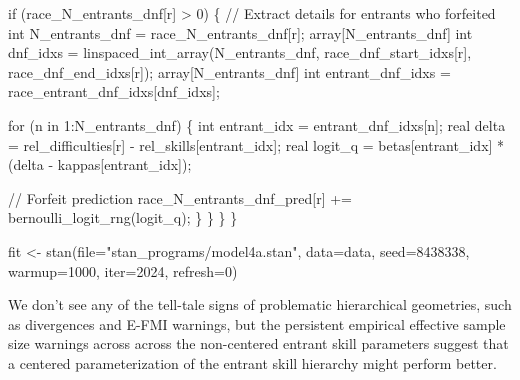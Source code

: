 \documentclass[
  letterpaper,
  DIV=11,
  numbers=noendperiod]{scrartcl}
\newenvironment{Shaded}{\begin{snugshade}}{\end{snugshade}}
\newcommand{\AttributeTok}[1]{\textcolor[rgb]{0.40,0.45,0.13}{#1}}
\newcommand{\CommentTok}[1]{\textcolor[rgb]{0.37,0.37,0.37}{#1}}
\newcommand{\ControlFlowTok}[1]{\textcolor[rgb]{0.00,0.23,0.31}{#1}}
\newcommand{\DataTypeTok}[1]{\textcolor[rgb]{0.68,0.00,0.00}{#1}}
\newcommand{\DecValTok}[1]{\textcolor[rgb]{0.68,0.00,0.00}{#1}}
\newcommand{\FunctionTok}[1]{\textcolor[rgb]{0.28,0.35,0.67}{#1}}
\newcommand{\NormalTok}[1]{\textcolor[rgb]{0.00,0.23,0.31}{#1}}
\newcommand{\OtherTok}[1]{\textcolor[rgb]{0.00,0.23,0.31}{#1}}
\newcommand{\StringTok}[1]{\textcolor[rgb]{0.13,0.47,0.30}{#1}}
\begin{document}
\begin{codelisting}
\begin{Shaded}
\begin{Highlighting}[]
    \ControlFlowTok{if}\NormalTok{ (race\_N\_entrants\_dnf[r] \textgreater{} }\DecValTok{0}\NormalTok{) \{}
      \CommentTok{// Extract details for entrants who forfeited}
      \DataTypeTok{int}\NormalTok{ N\_entrants\_dnf = race\_N\_entrants\_dnf[r];}
      \DataTypeTok{array}\NormalTok{[N\_entrants\_dnf]}
        \DataTypeTok{int}\NormalTok{ dnf\_idxs = linspaced\_int\_array(N\_entrants\_dnf,}
\NormalTok{                                           race\_dnf\_start\_idxs[r],}
\NormalTok{                                           race\_dnf\_end\_idxs[r]);}
      \DataTypeTok{array}\NormalTok{[N\_entrants\_dnf]}
        \DataTypeTok{int}\NormalTok{ entrant\_dnf\_idxs = race\_entrant\_dnf\_idxs[dnf\_idxs];}

      \ControlFlowTok{for}\NormalTok{ (n }\ControlFlowTok{in} \DecValTok{1}\NormalTok{:N\_entrants\_dnf) \{}
        \DataTypeTok{int}\NormalTok{ entrant\_idx = entrant\_dnf\_idxs[n];}
        \DataTypeTok{real}\NormalTok{ delta = rel\_difficulties[r] {-} rel\_skills[entrant\_idx];}
        \DataTypeTok{real}\NormalTok{ logit\_q = betas[entrant\_idx] * (delta {-} kappas[entrant\_idx]);}

        \CommentTok{// Forfeit prediction}
\NormalTok{        race\_N\_entrants\_dnf\_pred[r] += bernoulli\_logit\_rng(logit\_q);}
\NormalTok{      \}}
\NormalTok{    \}}
\NormalTok{  \}}
\NormalTok{\}}
\end{Highlighting}
\end{Shaded}

\end{codelisting}

\begin{Shaded}
\begin{Highlighting}[]
\NormalTok{fit }\OtherTok{\textless{}{-}} \FunctionTok{stan}\NormalTok{(}\AttributeTok{file=}\StringTok{"stan\_programs/model4a.stan"}\NormalTok{,}
            \AttributeTok{data=}\NormalTok{data, }\AttributeTok{seed=}\DecValTok{8438338}\NormalTok{,}
            \AttributeTok{warmup=}\DecValTok{1000}\NormalTok{, }\AttributeTok{iter=}\DecValTok{2024}\NormalTok{, }\AttributeTok{refresh=}\DecValTok{0}\NormalTok{)}
\end{Highlighting}
\end{Shaded}

We don't see any of the tell-tale signs of problematic hierarchical
geometries, such as divergences and E-FMI warnings, but the persistent
empirical effective sample size warnings across across the non-centered
entrant skill parameters suggest that a centered parameterization of the
entrant skill hierarchy might perform better.
\end{document}
